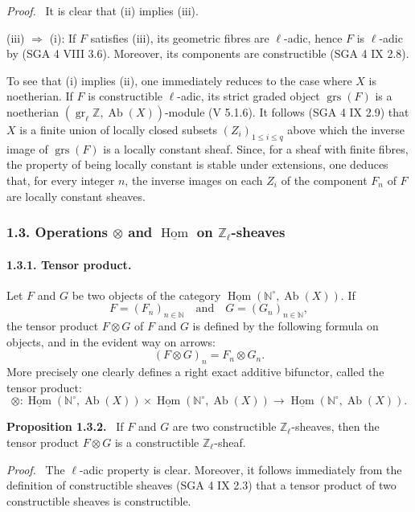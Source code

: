 \documentclass[11pt]{article}
\providecommand{\uHom}{\underline{\Hom}}
\newenvironment{statement}[1]{\par\medskip\noindent\textbf{#1.}\ }{\par\medskip}
\newenvironment{prooftext}[1][Proof]{\par\noindent\emph{#1.}\ }{\par\medskip}
\DeclareMathOperator{\Hom}{Hom}
\providecommand{\Hom}{\operatorname{Hom}}
\providecommand{\grs}{\operatorname{grs}}
\providecommand{\Ab}{\operatorname{Ab}}
\providecommand{\Ab}{\operatorname{Ab}}
\providecommand{\Hom}{\operatorname{Hom}}
\begin{document}
\begin{prooftext}[Proof]
It is clear that (ii) implies (iii).

(iii) \(\Longrightarrow\) (i): If \(F\) satisfies (iii), its geometric fibres are \(\ell\)-adic, hence \(F\) is \(\ell\)-adic by (SGA 4 VIII 3.6). Moreover, its components are constructible (SGA 4 IX 2.8).

To see that (i) implies (ii), one immediately reduces to the case where \(X\) is noetherian. If \(F\) is constructible \(\ell\)-adic, its strict graded object \(\grs(F)\) is a noetherian \((\operatorname{gr}_\ell\mathbb Z,\Ab(X))\)-module (V 5.1.6). It follows (SGA 4 IX 2.9) that \(X\) is a finite union of locally closed subsets \((Z_i)_{1\le i\le q}\) above which the inverse image of \(\grs(F)\) is a locally constant sheaf. Since, for a sheaf with finite fibres, the property of being locally constant is stable under extensions, one deduces that, for every integer \(n\), the inverse images on each \(Z_i\) of the component \(F_n\) of \(F\) are locally constant sheaves.
\end{prooftext}

\subsubsection*{1.3. Operations \(\otimes\) and \(\uHom\) on \(\mathbb Z_\ell\)-sheaves}

\paragraph{1.3.1. Tensor product.}
Let \(F\) and \(G\) be two objects of the category \(\uHom(\mathbb N^\circ,\Ab(X))\). If
\[
F=(F_n)_{n\in\mathbb N}\quad\text{and}\quad G=(G_n)_{n\in\mathbb N},
\]
the tensor product \(F\otimes G\) of \(F\) and \(G\) is defined by the following formula on objects, and in the evident way on arrows:
\[
(F\otimes G)_n=F_n\otimes G_n.
\]
More precisely one clearly defines a right exact additive bifunctor, called the tensor product:
\[
\otimes:\uHom(\mathbb N^\circ,\Ab(X))\times \uHom(\mathbb N^\circ,\Ab(X))
\longrightarrow \uHom(\mathbb N^\circ,\Ab(X)).
\]

\begin{statement}{Proposition 1.3.2}
If \(F\) and \(G\) are two constructible \(\mathbb Z_\ell\)-sheaves, then the tensor product \(F\otimes G\) is a constructible \(\mathbb Z_\ell\)-sheaf.
\end{statement}

\begin{prooftext}[Proof]
The \(\ell\)-adic property is clear. Moreover, it follows immediately from the definition of constructible sheaves (SGA 4 IX 2.3) that a tensor product of two constructible sheaves is constructible.
\end{prooftext}
\end{document}
